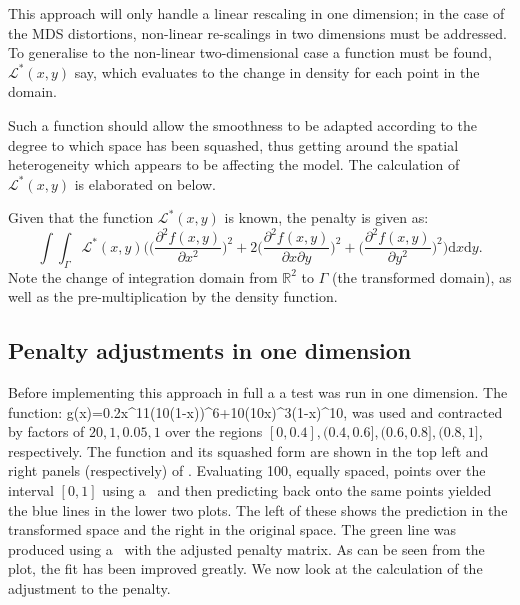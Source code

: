 This approach will only handle a linear rescaling in one dimension; in the case of the MDS distortions, non-linear re-scalings in two dimensions must be addressed. To generalise  to the non-linear two-dimensional case a function must be found, $\mathcal{L}^*(x,y)$ say, which evaluates to the change in density for each point in the domain. 

Such a function should allow the smoothness to be adapted according to the degree to which space has been squashed, thus getting around the spatial heterogeneity which appears to be affecting the model. The calculation of $\mathcal{L}^*(x,y)$ is elaborated on below.

Given that the function $\mathcal{L}^*(x,y)$ is known, the penalty is given as:
\begin{equation}
\int\int_\Gamma \mathcal{L}^*(x,y) \Big( \Big(\frac{\partial^2 f(x,y)}{\partial x^2}\Big)^2 + 2\Big(\frac{\partial^2 f(x,y)}{\partial x \partial y}\Big)^2 + \Big(\frac{\partial^2 f(x,y)}{\partial y^2}\Big)^2\Big) \text{d}x\text{d}y.
\label{kdeadjust}
\end{equation}
Note the change of integration domain from $\mathbb{R}^2$ to $\Gamma$ (the transformed domain), as well as the pre-multiplication by the density function.

\subsection{Penalty adjustments in one dimension}

Before implementing this approach in full a a test was run in one dimension. The function:
\be
g(x)=0.2x^{11}(10(1-x))^6+10(10x)^3(1-x)^{10},
\label{hardfcn}
\ee
was used and contracted by factors of $20,1,0.05,1$ over the regions $[0,0.4], (0.4,0.6],(0.6,0.8],(0.8,1]$, respectively. The function and its squashed form are shown in the top left and right panels (respectively) of . Evaluating 100, equally spaced, points over the interval $[0,1]$ using a \tprs\ and then predicting back onto the same points yielded the blue lines in the lower two plots. The left of these shows the prediction in the transformed space and the right in the original space. The green line was produced using a \tprs\ with the adjusted penalty matrix. As can be seen from the plot, the fit has been improved greatly. We now look at the calculation of the adjustment to the penalty.

